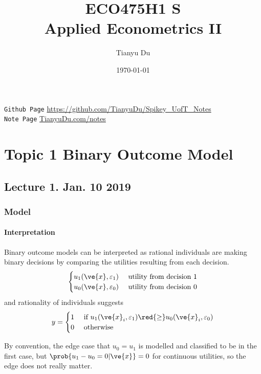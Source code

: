 \documentclass[11pt]{article}
\title{ECO475H1 S\\ Applied Econometrics II}
\author{Tianyu Du}
\date{\today}
\begin{document}
	\maketitle
	\doclicenseThis
	\texttt{Github Page} \url{https://github.com/TianyuDu/Spikey_UofT_Notes}\\
	\texttt{Note Page} \url{TianyuDu.com/notes}
	
	\tableofcontents
	\newpage
	
	\section{Topic 1 Binary Outcome Model}
		\subsection{Lecture 1. Jan. 10 2019}
			\subsubsection{Model}
				\paragraph{Interpretation} Binary outcome models can be interpreted as rational individuals are making binary decisions by comparing the utilities resulting from each decision.
				\begin{equation}
					\begin{cases}
						u_1(\ve{x}, \varepsilon_1) &\tx{ utility from decision 1} \\
						u_0(\ve{x}, \varepsilon_0) &\tx{ utility from decision 0}
					\end{cases}
				\end{equation}
				and rationality of individuals suggests
				\begin{equation}
					y = \begin{cases}
						1 &\tx{ if } u_1(\ve{x}_i, \varepsilon_1) \red{\geq} u_0(\ve{x}_i, \varepsilon_0) \\
						0 &\tx{ otherwise}
					\end{cases}
				\end{equation}
				\begin{assumption}
					By convention, the edge case that $u_0 = u_1$ is modelled and classified to be in the first case, but $\prob{u_1 - u_0 = 0|\ve{x}} =0$ for continuous utilities, so the edge does not really matter.
				\end{assumption}
				
\end{document}
